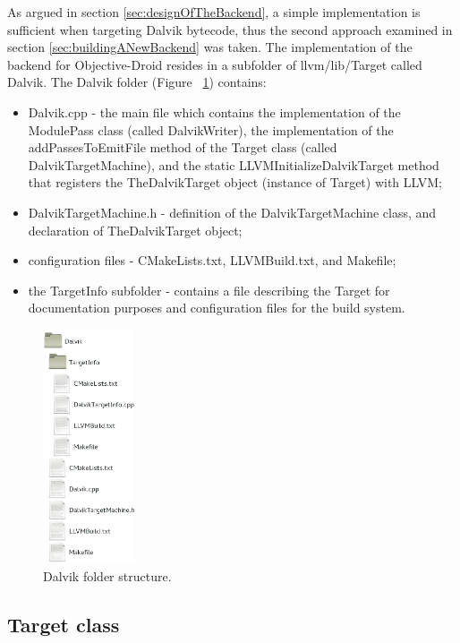 \documentclass[parskip]{cs4rep}
\begin{document}
As argued in section \ref{sec:designOfTheBackend}, a simple implementation is sufficient when targeting Dalvik bytecode, thus the second approach examined in section \ref{sec:buildingANewBackend} was taken. The implementation of the backend for Objective-Droid resides in a subfolder of llvm/lib/Target called Dalvik. The Dalvik folder (Figure ~\ref{fig:dalvikFolder}) contains: 
\begin{itemize}
\item Dalvik.cpp - the main file which contains the implementation of the ModulePass class (called DalvikWriter), the implementation of the addPassesToEmitFile method of the Target class (called DalvikTargetMachine), and the static LLVMInitializeDalvikTarget method that registers the TheDalvikTarget object (instance of Target) with LLVM;
\item DalvikTargetMachine.h - definition of the DalvikTargetMachine class, and declaration of TheDalvikTarget object;
\item configuration files - CMakeLists.txt, LLVMBuild.txt, and Makefile;
\item the TargetInfo subfolder - contains a file describing the Target for documentation purposes and configuration files for the build system.
\end{itemize}

\begin{figure}[htb]
    \centering
        \includegraphics[width=0.24\textwidth]{dalvik-folder}
    \caption{Dalvik folder structure.}
    \label{fig:dalvikFolder}    
\end{figure}

\subsection{Target class}
\end{document}
